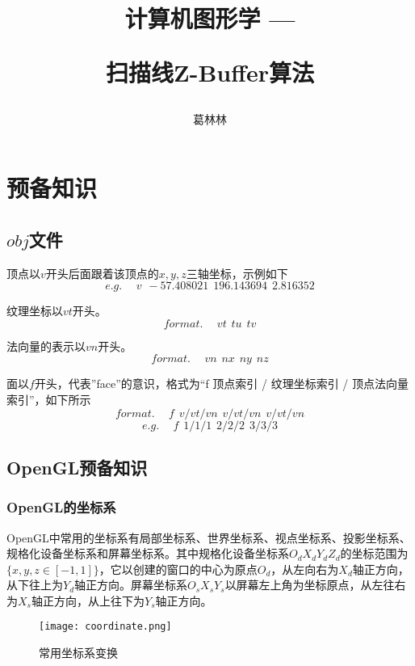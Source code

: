 \documentclass[10pt]{article}
\title{计算机图形学 \hspace{2pt}—\hspace{2pt} \begin{large}扫描线Z-Buffer算法 \end{large} }
\author{葛林林}
\begin{document}
\maketitle


\section{预备知识}
\subsection{$obj$文件}
顶点以$v$开头后面跟着该顶点的$x,y,z$三轴坐标，示例如下
$$e.g. \hspace{15pt} v\hspace{5pt} -57.408021\hspace{5pt}196.143694\hspace{5pt}2.816352$$

纹理坐标以$vt$开头。
$$format.\hspace{15pt} vt \hspace{5pt}tu \hspace{5pt} tv$$

法向量的表示以$vn$开头。
$$format.\hspace{15pt} vn \hspace{5pt} nx\hspace{5pt} ny \hspace{5pt} nz$$

面以$f$开头，代表”face”的意识，格式为“f 顶点索引 / 纹理坐标索引 / 顶点法向量索引”，如下所示
$$format.\hspace{15pt} f \hspace{5pt} v/vt/vn \hspace{5pt} v/vt/vn \hspace{5pt} v/vt/vn$$
$$e.g.\hspace{15pt} f \hspace{5pt} 1/1/1 \hspace{5pt} 2/2/2 \hspace{5pt} 3/3/3$$
\subsection{OpenGL预备知识}
\subsubsection{OpenGL的坐标系}
OpenGL中常用的坐标系有局部坐标系、世界坐标系、视点坐标系、投影坐标系、规格化设备坐标系和屏幕坐标系。其中规格化设备坐标系$O_dX_dY_dZ_d$的坐标范围为$\{x,y,z \in [-1,1]\}$，它以创建的窗口的中心为原点$O_d$，从左向右为$X_d$轴正方向，从下往上为$Y_d$轴正方向。屏幕坐标系$O_sX_sY_s$以屏幕左上角为坐标原点，从左往右为$X_s$轴正方向，从上往下为$Y_s$轴正方向。
\begin{figure}[H]
\begin{center}
\texttt{[image: coordinate.png]}
\caption{常用坐标系变换}
\end{center}
\end{figure}
\end{document}
